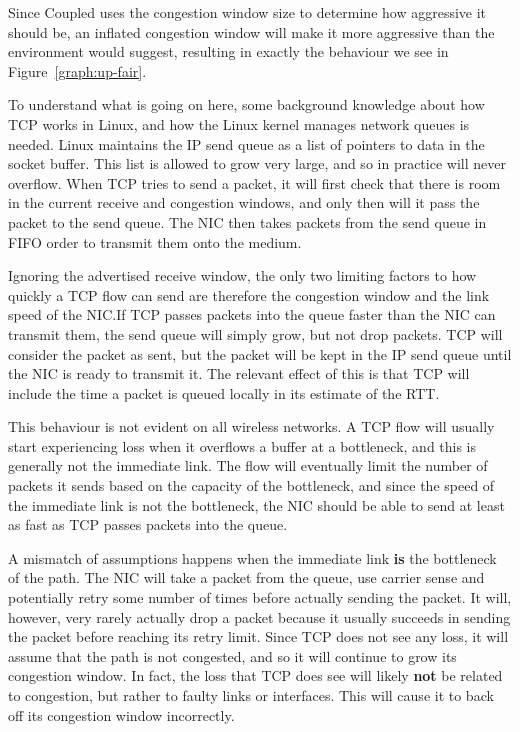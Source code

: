 Since Coupled uses the congestion window size to determine how aggressive it
should be, an inflated congestion window will make it more aggressive than the 
environment would suggest, resulting in exactly the behaviour we see in
Figure~\ref{graph:up-fair}.

To understand what is going on here, some background knowledge about how TCP
works in Linux, and how the Linux kernel manages network queues is needed. Linux
maintains the IP send queue as a list of pointers to data in the socket buffer. 
This list is allowed to grow very large, and so in practice will never overflow.
When TCP tries to send a packet, it will first check that there is room in
the current receive and congestion windows, and only then will it pass the packet to the
send queue. The NIC then takes packets  from the send queue in FIFO order to
transmit them onto the medium.

Ignoring the advertised receive window, the only two limiting factors to how
quickly a TCP flow
can send are therefore the congestion window and the link speed of the NIC.\@ If
TCP passes packets into the queue faster than the NIC can transmit them, the
send queue will simply grow, but not drop packets. TCP will consider the
packet as sent, but the packet will be kept in the IP send queue until
the NIC is ready to transmit it. The relevant effect of this is that TCP will
include the time a packet is queued locally in its estimate of the RTT.

This behaviour is not evident on all wireless networks. A TCP flow
will usually start experiencing loss when it overflows a
buffer at a bottleneck, and this is generally not the immediate link.
The flow will eventually limit the number of packets it sends based on the
capacity of the bottleneck, and since the speed of the immediate link is not
the bottleneck, the NIC should be able to send at least as fast as TCP passes
packets into the queue.

A mismatch of assumptions happens when the immediate link \textbf{is} the 
bottleneck of the path. The NIC will take a packet from the queue, use carrier 
sense and potentially retry some number of times before actually sending the 
packet. It will, however, very rarely actually drop a packet because it usually 
succeeds in sending the packet before reaching its retry limit. Since TCP does 
not see any loss, it will assume that the path is not congested, and so it will 
continue to grow its congestion window.  In fact, the loss that TCP does see 
will likely \textbf{not} be related to congestion, but rather to faulty links or interfaces.
This will cause it to back off its congestion window incorrectly.

